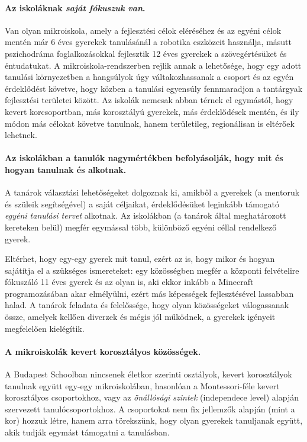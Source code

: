 \paragraph{Az iskoláknak \emph{saját fókuszuk van}.}

    Van olyan mikroiskola, amely a fejlesztési célok eléréséhez és az egyéni célok
    mentén már 6 éves gyerekek tanulásánál a robotika eszközeit használja,
    másutt pszichodráma foglalkozásokkal fejlesztik 12 éves gyerekek a szövegértésüket és
    éntudatukat. A
    mikroiskola-rendszerben rejlik annak a lehetősége, hogy egy adott tanulási
    környezetben a hangsúlyok úgy váltakozhassanak a csoport és az egyén
    érdeklődést követve, hogy közben a tanulási egyensúly fennmaradjon a
    tantárgyak fejlesztési területei között. Az iskolák nemcsak abban térnek el
    egymástól, hogy kevert korcsoportban, más korosztályú gyerekek, más
    érdeklődések mentén, és ily módon más célokat követve tanulnak, hanem
    területileg, regionálisan is eltérőek lehetnek.


  \paragraph{Az iskolákban a tanulók nagymértékben befolyásolják, hogy mit és hogyan tanulnak és alkotnak.}

    A tanárok választási lehetőségeket dolgoznak ki, amikből a gyerekek (a
    mentoruk és szüleik segítségével) a saját céljaikat, érdeklődésüket leginkább
    támogató \emph{egyéni tanulási tervet} alkotnak. Az iskolákban (a tanárok által
    meghatározott kereteken belül) megfér egymással több, különböző egyéni céllal
    rendelkező gyerek.

    Eltérhet, hogy egy-egy gyerek mit tanul, ezért az is, hogy mikor és hogyan
    sajátítja el a szükséges ismereteket: egy közösségben megfér a központi
    felvételire fókuszáló 11 éves gyerek és az olyan is, aki ekkor inkább a
    Minecraft programozásában akar elmélyülni, ezért más képességek fejlesztésével
    lassabban halad. A tanárok feladata és felelőssége, hogy olyan közösségeket
    válogassanak össze, amelyek kellően diverzek és mégis jól működnek, a gyerekek
    igényeit megfelelően kielégítik.

  \paragraph{A mikroiskolák kevert korosztályos közösségek.}

    A Budapest Schoolban nincsenek életkor szerinti osztályok, kevert korosztályok tanulnak
    együtt egy-egy mikroiskolában, hasonlóan a Montessori-féle kevert korosztályos csoportokhoz, vagy az \emph{önállósági szintek} (independece level\cite{indepence_level}) alapján szervezett tanulócsoportokhoz. A csoportokat nem fix jellemzők alapján (mint a kor) hozzuk létre, hanem arra törekszünk, hogy olyan gyerekek tanuljanak együtt, akik tudják egymást támogatni a tanulásban.

